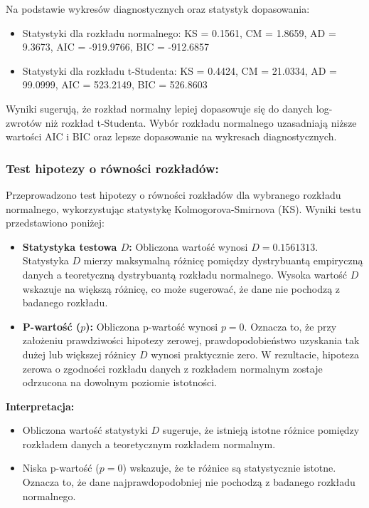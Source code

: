 \documentclass[a4paper,11pt]{article}
\begin{document}
Na podstawie wykresów diagnostycznych oraz statystyk dopasowania:
\begin{itemize}
    \item Statystyki dla rozkładu normalnego: KS = 0.1561, CM = 1.8659, AD = 9.3673, AIC = -919.9766, BIC = -912.6857
    \item Statystyki dla rozkładu t-Studenta: KS = 0.4424, CM = 21.0334, AD = 99.0999, AIC = 523.2149, BIC = 526.8603
\end{itemize}

Wyniki sugerują, że rozkład normalny lepiej dopasowuje się do danych log-zwrotów niż rozkład t-Studenta. Wybór rozkładu normalnego uzasadniają niższe wartości AIC i BIC oraz lepsze dopasowanie na wykresach diagnostycznych.

\subsubsection{Test hipotezy o równości rozkładów:}

Przeprowadzono test hipotezy o równości rozkładów dla wybranego rozkładu normalnego, wykorzystując statystykę Kolmogorova-Smirnova (KS). Wyniki testu przedstawiono poniżej:

\begin{itemize}
    \item \textbf{Statystyka testowa \( D \):} Obliczona wartość wynosi \( D = 0.1561313 \). Statystyka \( D \) mierzy maksymalną różnicę pomiędzy dystrybuantą empiryczną danych a teoretyczną dystrybuantą rozkładu normalnego. Wysoka wartość \( D \) wskazuje na większą różnicę, co może sugerować, że dane nie pochodzą z badanego rozkładu.
    \item \textbf{P-wartość (\( p \)):} Obliczona p-wartość wynosi \( p = 0 \). Oznacza to, że przy założeniu prawdziwości hipotezy zerowej, prawdopodobieństwo uzyskania tak dużej lub większej różnicy \( D \) wynosi praktycznie zero. W rezultacie, hipoteza zerowa o zgodności rozkładu danych z rozkładem normalnym zostaje odrzucona na dowolnym poziomie istotności.
\end{itemize}

\textbf{Interpretacja:}
\begin{itemize}
    \item Obliczona wartość statystyki \( D \) sugeruje, że istnieją istotne różnice pomiędzy rozkładem danych a teoretycznym rozkładem normalnym. 
    \item Niska p-wartość (\( p = 0 \)) wskazuje, że te różnice są statystycznie istotne. Oznacza to, że dane najprawdopodobniej nie pochodzą z badanego rozkładu normalnego.
\end{itemize}
\end{document}
